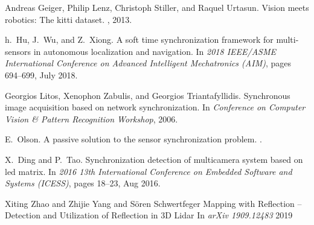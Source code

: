 \documentclass[conference]{IEEEtran}
\begin{document}
\begin{thebibliography}{00}
		Andreas Geiger, Philip Lenz, Christoph Stiller, and Raquel Urtasun.
		\newblock Vision meets robotics: The kitti dataset.
		, 2013.
		
		h.~{Hu}, J.~{Wu}, and Z.~{Xiong}.
		\newblock A soft time synchronization framework for multi-sensors in autonomous
		localization and navigation.
		\newblock In {\em 2018 IEEE/ASME International Conference on Advanced
			Intelligent Mechatronics (AIM)}, pages 694--699, July 2018.
		
		Georgios Litos, Xenophon Zabulis, and Georgios Triantafyllidis.
		\newblock Synchronous image acquisition based on network synchronization.
		\newblock In {\em Conference on Computer Vision \& Pattern Recognition
			Workshop}, 2006.
		
		E.~Olson.
		\newblock A passive solution to the sensor synchronization problem.
		.
		
		X.~{Ding} and P.~{Tao}.
		\newblock Synchronization detection of multicamera system based on led matrix.
		\newblock In {\em 2016 13th International Conference on Embedded Software and
			Systems (ICESS)}, pages 18--23, Aug 2016.
		
		Xiting Zhao and Zhijie Yang and Sören Schwertfeger
		\newblock Mapping with Reflection -- Detection and Utilization of Reflection in 3D Lidar \newblock In {\em arXiv 1909.12483} 2019
		
	\end{thebibliography}
\end{document}
